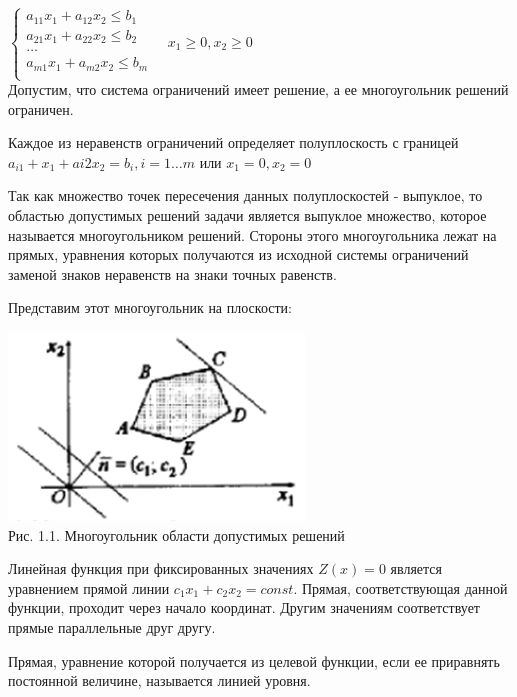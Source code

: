 \documentclass[a4paper, 12pt]{article}
\begin{document}
\begin{math}
  \begin{cases}
    a_{11}x_1+a_{12}x_2 \leq b_1\\
    a_{21}x_1+a_{22}x_2 \leq b_2\\
    \ldots\\
    a_{m1}x_1+a_{m2}x_2 \leq b_m\\
  \end{cases}
  \quad
  x_1 \geq 0, x_2 \geq 0
\end{math}\\

Допустим, что система ограничений имеет решение, а ее многоугольник решений ограничен.

Каждое из неравенств ограничений определяет полуплоскость с границей $a_{i1}+x_1+a{i2}x_2 = b_i, i=1\ldots m$ или $x_1=0,x_2=0$

Так как множество точек пересечения данных полуплоскостей - выпуклое, то областью допустимых решений задачи является выпуклое множество, которое называется многоугольником решений. Стороны этого многоугольника лежат на прямых, уравнения которых получаются из исходной системы ограничений заменой знаков неравенств на знаки точных равенств.

Представим этот многоугольник на плоскости:\\
\begin{center}
  \includegraphics[]{1-2.png}\\
  Рис. 1.1. Многоугольник области допустимых решений\\
\end{center}

Линейная функция при фиксированных значениях $Z(x)=0$ является уравнением прямой линии $c_1x_1+c_2x_2=const$. Прямая, соответствующая данной функции, проходит через начало координат. Другим значениям соответствует прямые параллельные друг другу.

Прямая, уравнение которой получается из целевой функции, если ее приравнять постоянной величине, называется линией уровня.
\end{document}
